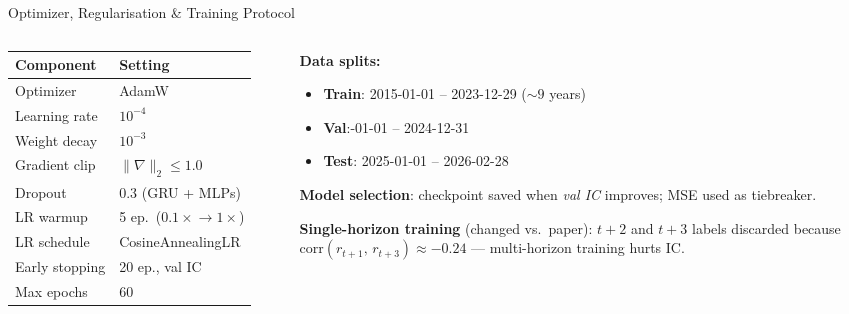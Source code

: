 \documentclass[aspectratio=169, 10pt]{beamer}
\begin{document}
\begin{frame}{Optimizer, Regularisation \& Training Protocol}
  \begin{columns}[T]
    \begin{column}{0.48\textwidth}
      \begin{center}
      \renewcommand{\arraystretch}{1.25}
      \begin{tabular}{ll}
        \toprule
        \textbf{Component} & \textbf{Setting} \\
        \midrule
        Optimizer        & AdamW \\
        Learning rate    & $10^{-4}$ \\
        Weight decay     & $10^{-3}$ \\
        Gradient clip    & $\|\nabla\|_2 \leq 1.0$ \\
        Dropout          & $0.3$ (GRU + MLPs) \\
        \midrule
        LR warmup        & 5 ep.\ ($0.1\!\times\!\to\!1\!\times$) \\
        LR schedule      & CosineAnnealingLR \\
        Early stopping   & 20 ep., val IC \\
        Max epochs       & 60 \\
        \bottomrule
      \end{tabular}
      \end{center}
    \end{column}
    \begin{column}{0.48\textwidth}
      \textbf{Data splits:}
      \begin{itemize}\setlength{\itemsep}{2pt}
        \item \textbf{Train}: 2015-01-01 – 2023-12-29 (${\sim}9$ years)
        \item \textbf{Val}:-01-01 – 2024-12-31
        \item \textbf{Test}: 2025-01-01 – 2026-02-28
      \end{itemize}

      \medskip
      \textbf{Model selection}: checkpoint saved when \emph{val IC}
      improves; MSE used as tiebreaker.

      \medskip
      \textbf{Single-horizon training}
      \textcolor{negative}{\footnotesize(changed vs.\ paper)}:
      $t{+}2$ and $t{+}3$ labels discarded because\\
      $\text{corr}(r_{t+1},\, r_{t+3}) \approx -0.24$ — multi-horizon
      training hurts IC.
    \end{column}
  \end{columns}
\end{frame}
\end{document}
